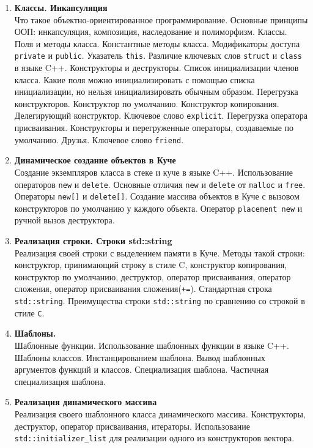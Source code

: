 \documentclass{article}
\begin{document}
\begin{enumerate}
\item  \textbf{Классы. Инкапсуляция}\\
Что такое объектно-ориентированное программирование. Основные принципы ООП: инкапсуляция, композиция, наследование и полиморфизм. Классы. Поля и методы класса. Константные методы класса. Модификаторы доступа \texttt{private} и \texttt{public}.  Указатель \texttt{this}.  Различие ключевых слов \texttt{struct} и \texttt{class} в языке C++. Конструкторы и деструкторы. Список инициализации членов класса. Какие поля можно инициализировать с помощью списка инициализации, но нельзя инициализировать обычным образом. Перегрузка конструкторов. Конструктор по умолчанию. Конструктор копирования. Делегирующий конструктор. Ключевое слово \texttt{explicit}. Перегрузка оператора присваивания. Конструкторы и перегруженные операторы, создаваемые по умолчанию.
Друзья. Ключевое слово \texttt{friend}. 

\item  \textbf{Динамическое создание объектов в Куче}\\
Создание экземпляров класса в стеке и куче в языке C++. Использование операторов \texttt{new} и \texttt{delete}. Основные отличия \texttt{new} и \texttt{delete} от \texttt{malloc} и \texttt{free}. Операторы \texttt{new[]} и \texttt{delete[]}. Создание массива объектов в Куче с вызовом конструкторов по умолчанию у каждого объекта. Оператор \texttt{placement new} и ручной вызов деструктора.

\item \textbf{Реализация строки. Строки std::string}\\
Реализация своей строки с выделением памяти в Куче. Методы такой строки: конструктор, принимающий строку в стиле C, конструктор копирования, конструктор по умолчанию, деструктор, оператор присваивания, оператор сложения, оператор присваивания сложения(\texttt{+=}).  Стандартная строка \texttt{std::string}. Преимущества строки \texttt{std::string} по сравнению со строкой в стиле \texttt{C}.


\item \textbf{Шаблоны.}\\
Шаблонные функции. Использование шаблонных функции в языке C++. Шаблоны классов. Инстанцированием шаблона. Вывод шаблонных аргументов функций и классов. Специализация шаблона. Частичная специализация шаблона.

\item \textbf{Реализация динамического массива}\\
Реализация своего шаблонного класса динамического массива. Конструкторы, деструктор, оператор присваивания, итераторы. Использование \texttt{std::initializer\_list} для реализации одного из конструкторов вектора.


\end{enumerate}
\end{document}
